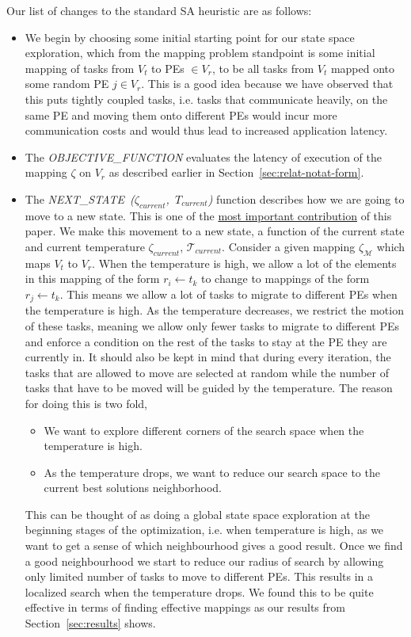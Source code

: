 Our list of changes to the standard SA heuristic are as follows:

\begin{itemize}

\item We begin by choosing some initial starting point for our state space exploration, which from
the mapping problem standpoint is some initial mapping of tasks from $V_t$ to
PEs $\in V_r$, to be all tasks from $V_t$ mapped onto
some random PE $j \in V_r$. This is a good idea because we have observed that
this puts tightly coupled tasks, i.e. tasks that communicate heavily, on the
same PE and moving them onto different PEs would incur more communication
costs and would thus lead to increased application latency.

\item The \textit{OBJECTIVE\_FUNCTION} evaluates the latency of execution of
the mapping $\zeta$ on $V_r$ as described earlier in
Section~\ref{sec:relat-notat-form}. 

\item The \mbox{\textit{NEXT\_STATE ($\zeta_{current}$, $T_{current}$)}}
  function describes how we are going to move to a new state. This is
  one of the \underline{most important contribution} of this paper. We
  make this movement to a new state, a function of the current state and
  current temperature $\zeta_{current}$,
  $\mathcal{T}_{current}$. Consider a given mapping $\zeta_\mathcal{M}$
  which maps $V_t$ to $V_r$. When the temperature is high, we allow a
  lot of the elements in this mapping of the form $r_i \leftarrow t_k$
  to change to mappings of the form $r_j \leftarrow t_k$. This means we
  allow a lot of tasks to migrate to different PEs when the temperature
  is high. As the temperature decreases, we restrict the motion of these
  tasks, meaning we allow only fewer tasks to migrate to different PEs
  and enforce a condition on the rest of the tasks to stay at the PE
  they are currently in. It should also be kept in mind that during
  every iteration, the tasks that are allowed to move are selected at
  random while the number of tasks that have to be moved will be guided
  by the temperature. The reason for doing this is two fold,
\begin{itemize}
\item We want to explore different corners of the search space when the
  temperature is high.
\item As the temperature drops, we want to reduce our search space to
  the current best solutions neighborhood.
\end{itemize}
This can be thought of as doing a global state space exploration at the
beginning stages of the optimization, i.e. when temperature is high, as
we want to get a sense of which neighbourhood gives a good result. Once
we find a good neighbourhood we start to reduce our radius of search by
allowing only limited number of tasks to move to different PEs. This
results in a localized search when the temperature drops. We found this
to be quite effective in terms of finding effective mappings as our
results from Section~\ref{sec:results} shows.


\end{itemize}
